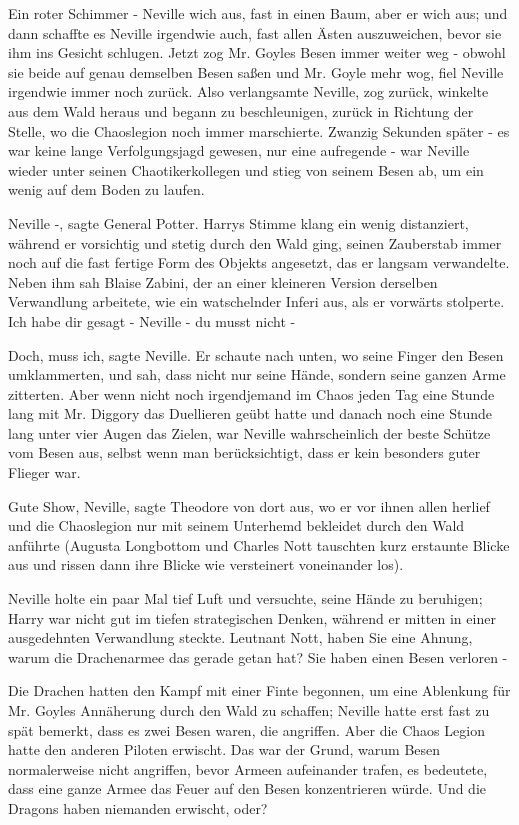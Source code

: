 Ein roter Schimmer - Neville wich aus, fast in einen Baum, aber er wich aus; und
dann schaffte es Neville irgendwie auch, fast allen Ästen auszuweichen, bevor
sie ihm ins Gesicht schlugen. Jetzt zog Mr. Goyles Besen immer weiter weg -
obwohl sie beide auf genau demselben Besen saßen und Mr. Goyle mehr wog, fiel
Neville irgendwie immer noch zurück. Also verlangsamte Neville, zog zurück,
winkelte aus dem Wald heraus und begann zu beschleunigen, zurück in Richtung der
Stelle, wo die Chaoslegion noch immer marschierte. Zwanzig Sekunden später - es
war keine lange Verfolgungsjagd gewesen, nur eine aufregende - war Neville
wieder unter seinen Chaotikerkollegen und stieg von seinem Besen ab, um ein
wenig auf dem Boden zu laufen.

\glqq Neville -\grqq{}, sagte General Potter. Harrys Stimme klang ein wenig
distanziert, während er vorsichtig und stetig durch den Wald ging, seinen
Zauberstab immer noch auf die fast fertige Form des Objekts angesetzt, das er
langsam verwandelte. Neben ihm sah Blaise Zabini, der an einer kleineren Version
derselben Verwandlung arbeitete, wie ein watschelnder Inferi aus, als er
vorwärts stolperte. \glqq Ich habe dir gesagt - Neville - du musst nicht
-\grqq{}

\glqq Doch, muss ich\grqq{}, sagte Neville. Er schaute nach unten, wo seine
Finger den Besen umklammerten, und sah, dass nicht nur seine Hände, sondern
seine ganzen Arme zitterten. Aber wenn nicht noch irgendjemand im Chaos jeden
Tag eine Stunde lang mit Mr. Diggory das Duellieren geübt hatte und danach noch
eine Stunde lang unter vier Augen das Zielen, war Neville wahrscheinlich der
beste Schütze vom Besen aus, selbst wenn man berücksichtigt, dass er kein
besonders guter Flieger war.

\glqq Gute Show, Neville\grqq{}, sagte Theodore von dort aus, wo er vor ihnen
allen herlief und die Chaoslegion nur mit seinem Unterhemd bekleidet durch den
Wald anführte (Augusta Longbottom und Charles Nott tauschten kurz erstaunte
Blicke aus und rissen dann ihre Blicke wie versteinert voneinander los).

Neville holte ein paar Mal tief Luft und versuchte, seine Hände zu beruhigen;
Harry war nicht gut im tiefen strategischen Denken, während er mitten in einer
ausgedehnten Verwandlung steckte. \glqq Leutnant Nott, haben Sie eine Ahnung,
warum die Drachenarmee das gerade getan hat? Sie haben einen Besen verloren
-\grqq{}

Die Drachen hatten den Kampf mit einer Finte begonnen, um eine Ablenkung für Mr.
Goyles Annäherung durch den Wald zu schaffen; Neville hatte erst fast zu spät
bemerkt, dass es zwei Besen waren, die angriffen. Aber die Chaos Legion hatte
den anderen Piloten erwischt. Das war der Grund, warum Besen normalerweise nicht
angriffen, bevor Armeen aufeinander trafen, es bedeutete, dass eine ganze Armee
das Feuer auf den Besen konzentrieren würde. \glqq Und die Dragons haben
niemanden erwischt, oder?\grqq{}

